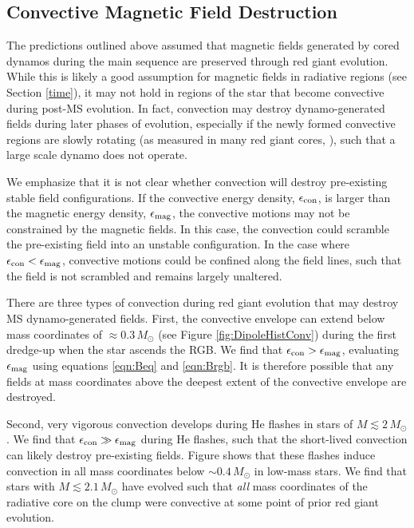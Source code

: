 \subsection{Convective Magnetic Field Destruction}

The predictions outlined above assumed that magnetic fields generated by cored dynamos during the main sequence are preserved through red giant evolution. While this is likely a good assumption for magnetic fields in radiative regions (see Section \ref{time}), it may not hold in regions of the star that become convective during post-MS evolution. In fact, convection may destroy dynamo-generated fields during later phases of evolution, especially if the newly formed convective regions are slowly rotating (as measured in many red giant cores, \cite{Mosser_2012}), such that a large scale dynamo does not operate.

We emphasize that it is not clear whether convection will destroy pre-existing stable field configurations. If the convective energy density, $\epsilon_{\rm con}$, is larger than the magnetic energy density, $\epsilon_{\rm mag}$, the convective motions may not be constrained by the magnetic fields. In this case, the convection could scramble the pre-existing field into an unstable configuration. In the case where $\epsilon_{\rm con} < \epsilon_{\rm mag}$, convective motions could be confined along the field lines, such that the field is not scrambled and remains largely unaltered.

There are three types of convection during red giant evolution that may destroy MS dynamo-generated fields. First, the convective envelope can extend below mass coordinates of $\approx 0.3 \, M_\odot$ (see Figure \ref{fig:DipoleHistConv}) during the first dredge-up when the star ascends the RGB. We find that $\epsilon_{\rm con} > \epsilon_{\rm mag}$, evaluating $\epsilon_{\rm mag}$ using equations \ref{eqn:Beq} and \ref{eqn:Brgb}. It is therefore possible that any fields at mass coordinates above the deepest extent of the convective envelope are destroyed.

Second, very vigorous convection develops during He flashes in stars of $M \lesssim 2 \, M_\odot$. We find that $\epsilon_{\rm con} \gg \epsilon_{\rm mag}$ during He flashes, such that the short-lived convection can likely destroy pre-existing fields. Figure \label{fig:DipoleHistConv} shows that these flashes induce convection in all mass coordinates below $ \sim \! 0.4 \, M_\odot$ in low-mass stars. We find that stars with $M \lesssim 2.1 \, M_\odot$ have evolved such that {\it all} mass coordinates  of the radiative core on the clump were convective at some point of prior red giant evolution. 


